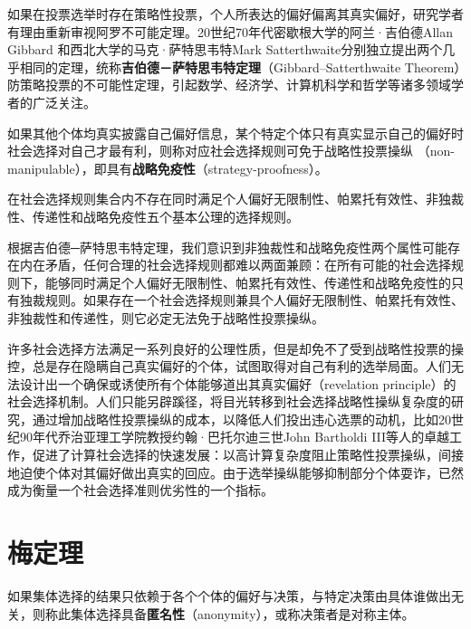 如果在投票选举时存在策略性投票，个人所表达的偏好偏离其真实偏好，研究学者有理由重新审视阿罗不可能定理。20世纪70年代密歇根大学的阿兰·吉伯德Allan Gibbard 和西北大学的马克·萨特思韦特Mark Satterthwaite分别独立提出两个几乎相同的定理，统称\textbf{吉伯德－萨特思韦特定理}（Gibbard--Satterthwaite Theorem）防策略投票的不可能性定理，引起数学、经济学、计算机科学和哲学等诸多领域学者的广泛关注。

\begin{definition}[战略免疫性]
如果其他个体均真实披露自己偏好信息，某个特定个体只有真实显示自己的偏好时社会选择对自己才最有利，则称对应社会选择规则可免于战略性投票操纵
（non-manipulable），即具有\textbf{战略免疫性}（strategy-proofness）。
\end{definition}

\begin{theorem}
在社会选择规则集合内不存在同时满足个人偏好无限制性、帕累托有效性、非独裁性、传递性和战略免疫性五个基本公理的选择规则。
\end{theorem}
根据吉伯德─萨特思韦特定理，我们意识到非独裁性和战略免疫性两个属性可能存在内在矛盾，任何合理的社会选择规则都难以两面兼顾：在所有可能的社会选择规则下，能够同时满足个人偏好无限制性、帕累托有效性、传递性和战略免疫性的只有独裁规则。如果存在一个社会选择规则兼具个人偏好无限制性、帕累托有效性、非独裁性和传递性，则它必定无法免于战略性投票操纵。

许多社会选择方法满足一系列良好的公理性质，但是却免不了受到战略性投票的操控，总是存在隐瞒自己真实偏好的个体，试图取得对自己有利的选举局面。人们无法设计出一个确保或诱使所有个体能够道出其真实偏好（revelation principle）的社会选择机制。人们只能另辟蹊径，将目光转移到社会选择战略性操纵复杂度的研究，通过增加战略性投票操纵的成本，以降低人们投出违心选票的动机，比如20世纪90年代乔治亚理工学院教授约翰·巴托尔迪三世John Bartholdi III等人\cite{bartholdi1989computational,bartholdi1989voting}的卓越工作，促进了计算社会选择的快速发展：以高计算复杂度阻止策略性投票操纵，间接地迫使个体对其偏好做出真实的回应。由于选举操纵能够抑制部分个体耍诈，已然成为衡量一个社会选择准则优劣性的一个指标。

\section{梅定理}
\begin{definition}[匿名性]
如果集体选择的结果只依赖于各个个体的偏好与决策，与特定决策由具体谁做出无关，则称此集体选择具备\textbf{匿名性}（anonymity），或称决策者是对称主体。
\end{definition}

